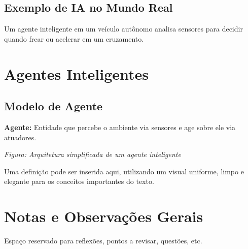 \subsection{Exemplo de IA no Mundo Real}
\begin{examplebox}
Um agente inteligente em um veículo autônomo analisa sensores para decidir quando frear ou acelerar em um cruzamento.
\end{examplebox}

\section{Agentes Inteligentes}

\subsection{Modelo de Agente}
\begin{conceptbox}
\textbf{Agente:} Entidade que percebe o ambiente via sensores e age sobre ele via atuadores.
\end{conceptbox}

\begin{diagrambox}
\textit{Figura: Arquitetura simplificada de um agente inteligente}
\end{diagrambox}

\begin{definitionbox}
Uma definição pode ser inserida aqui, utilizando um visual uniforme, limpo e elegante para os conceitos importantes do texto.
\end{definitionbox}

\section{Notas e Observações Gerais}
Espaço reservado para reflexões, pontos a revisar, questões, etc.
